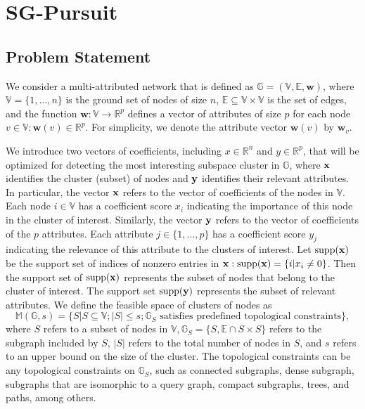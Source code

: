\documentclass{article}
\begin{document}
\section{\textsc{SG}-Pursuit}

\subsection{Problem Statement}

We consider a multi-attributed network that is defined as $\mathbb{G}=(\mathbb{V},\mathbb{E},\mathbf{w})$, where $\mathbb{V}=\{1,\dots,n \}$ is the ground set of nodes of size $n$, $\mathbb{E}\subseteq\mathbb{V}\times\mathbb{V}$ is the set of edges, and the function $\mathbf{w}:\mathbb{V}\to\mathbb{R}^p$ defines a vector of attributes of size $p$ for each node $v\in\mathbb{V}:\mathbf{w}(v)\in\mathbb{R}^p$. For simplicity, we denote the attribute vector $\mathbf{w}(v)$ by $\mathbf{w}_v$.

We introduce two vectors of coefficients, including $x\in\mathbb{R}^n$ and $y\in\mathbb{R}^p$, that will be optimized for detecting the most interesting subspace cluster in $\mathbb{G}$, where ${\bf x}$ identifies the cluster (subset) of nodes and ${\bf y}$ identifies their relevant attributes. In particular, the vector ${\bf x}$ refers to the vector of coefficients of the nodes in $\mathbb{V}$. Each node $i\in\mathbb{V}$ has a coefficient score $x_i$ indicating the importance of this node in the cluster of interest. Similarly, the vector ${\bf y}$ refers to the vector of coefficients of the $p$ attributes. Each attribute $j\in\{1,\dots,p\}$ has a coefficient score $y_j$ indicating the relevance of this attribute to the clusters of interest. Let $\mathrm{supp}({\bf x})$ be the support set of indices of nonzero entries in ${\bf x}:\mathrm{supp}({\bf x})=\{i|x_i\neq 0 \}$. Then the support set of $\mathrm{supp}({\bf x})$ represents the subset of nodes that belong to the cluster of interest. The support set $\mathrm{supp}({\bf y})$ represents the subset of relevant attributes. We define the feasible space of clusters of nodes as
\begin{equation*}
\mathbb{M}(\mathbb{G},s)=\{S|S\subseteq\mathbb{V};|S|\leq s;\mathbb{G}_S \text{ satisfies predefined topological constraints} \},
\end{equation*}
where $S$ refers to a subset of nodes in $\mathbb{V}, \mathbb{G}_S=\{S,\mathbb{E}\cap S\times S \}$ refers to the subgraph included by $S$, $|S|$ refers to the total number of nodes in $S$, and $s$ refers to an upper bound on the size of the cluster. The topological constraints can be any topological constraints on $\mathbb{G}_S$, such as connected subgraphs, dense subgraph, subgraphs that are isomorphic to a query graph, compact subgraphs, trees, and paths, among others.
\end{document}
